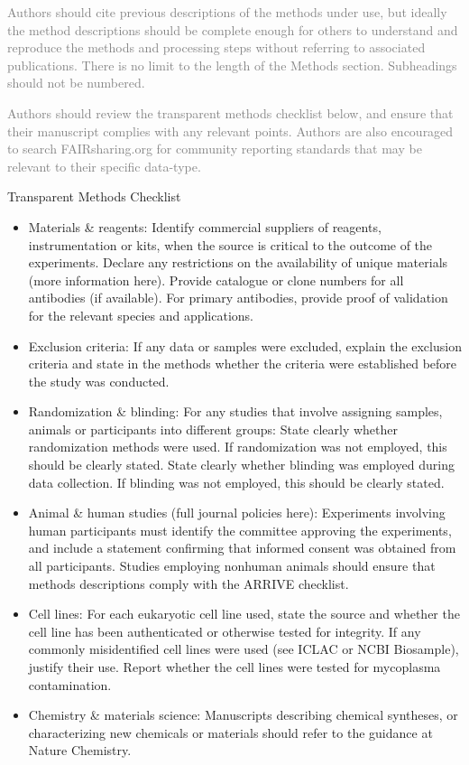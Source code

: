 \documentclass[fleqn,10pt]{wlscirep}
\begin{document}
\textcolor{gray}{Authors should cite previous descriptions of the methods under use, but ideally the method descriptions should be complete enough for others to understand and reproduce the methods and processing steps without referring to associated publications. There is no limit to the length of the Methods section. Subheadings should not be numbered.}

\textcolor{gray}{Authors should review the transparent methods checklist below, and ensure that their manuscript complies with any relevant points. Authors are also encouraged to search FAIRsharing.org for community reporting standards that may be relevant to their specific data-type.}

Transparent Methods Checklist

\begin{itemize}
  \item
  Materials \& reagents:
  Identify commercial suppliers of reagents, instrumentation or kits, when the source is critical to the outcome of the experiments.
  Declare any restrictions on the availability of unique materials (more information here).
  Provide catalogue or clone numbers for all antibodies (if available). For primary antibodies, provide proof of validation for the relevant species and applications.
  
  \item
  Exclusion criteria: If any data or samples were excluded, explain the exclusion criteria and state in the methods whether the criteria were established before the study was conducted.
  
  \item
  Randomization \& blinding: For any studies that involve assigning samples, animals or participants into different groups:
  State clearly whether randomization methods were used. If randomization was not employed, this should be clearly stated.
  State clearly whether blinding was employed during data collection. If blinding was not employed, this should be clearly stated.
  
  \item
  Animal \& human studies (full journal policies here):
  Experiments involving human participants must identify the committee approving the experiments, and include a statement confirming that informed consent was obtained from all participants.
  Studies employing nonhuman animals should ensure that methods descriptions comply with the ARRIVE checklist.
  
  \item
  Cell lines:
  For each eukaryotic cell line used, state the source and whether the cell line has been authenticated or otherwise tested for integrity.
  If any commonly misidentified cell lines were used (see ICLAC or NCBI Biosample), justify their use.
  Report whether the cell lines were tested for mycoplasma contamination.
  
  \item
  Chemistry \& materials science: Manuscripts describing chemical syntheses, or characterizing new chemicals or materials should refer to the guidance at Nature Chemistry.
  
\end{itemize}
\fi
\end{document}
